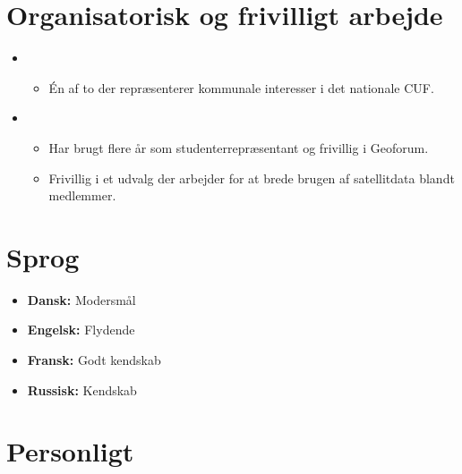 \documentclass[11pt,a4paper,roman]{moderncv}        %
\begin{document}
\section{Organisatorisk og frivilligt arbejde}
\begin{itemize}
    \item{}
    \begin{itemize} 
    \item Én af to der repræsenterer kommunale interesser i det nationale CUF.
    \end{itemize} 
    
    \vspace{2pt}

    \item{}
    \begin{itemize} 
    \item Har brugt flere år som studenterrepræsentant og frivillig i Geoforum.
    \item Frivillig i et udvalg der arbejder for at brede brugen af satellitdata blandt medlemmer.
    \end{itemize} 
    
\end{itemize}

\section{Sprog}
\vspace{1pt}
\begin{itemize}
\item \textbf{Dansk:} Modersmål 
\vspace{1pt}
\item \textbf{Engelsk:} Flydende 
\vspace{1pt}
\item \textbf{Fransk:} Godt kendskab
\vspace{1pt}
\item \textbf{Russisk:} Kendskab
\end{itemize}
\section{Personligt}

\nocite{*}

\end{document}
